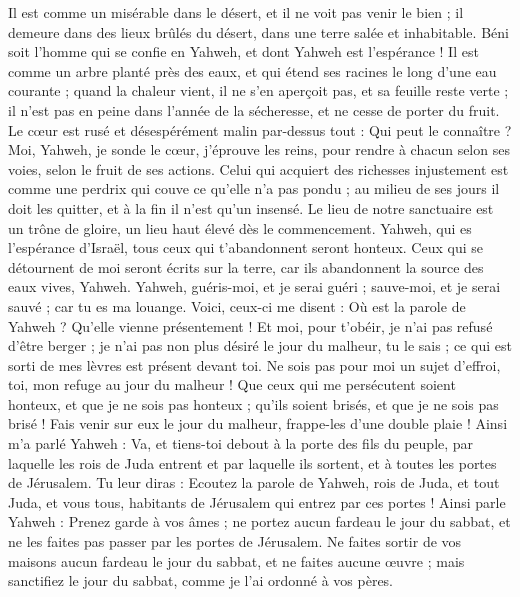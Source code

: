 \begin{multicols}{2}
Il est comme un misérable dans le désert, et il ne voit pas venir le bien ; il demeure dans des lieux brûlés du désert, dans une terre salée et inhabitable.
Béni soit l'homme qui se confie en Yahweh, et dont Yahweh est l'espérance !
Il est comme un arbre planté près des eaux, et qui étend ses racines le long d'une eau courante ; quand la chaleur vient, il ne s'en aperçoit pas, et sa feuille reste verte ; il n'est pas en peine dans l'année de la sécheresse, et ne cesse de porter du fruit.
Le cœur est rusé et désespérément malin par-dessus tout : Qui peut le connaître ?
Moi, Yahweh, je sonde le cœur, j'éprouve les reins, pour rendre à chacun selon ses voies, selon le fruit de ses actions.
Celui qui acquiert des richesses injustement est comme une perdrix qui couve ce qu'elle n'a pas pondu ; au milieu de ses jours il doit les quitter, et à la fin il n'est qu'un insensé.
Le lieu de notre sanctuaire est un trône de gloire, un lieu haut élevé dès le commencement.
Yahweh, qui es l'espérance d'Israël, tous ceux qui t'abandonnent seront honteux. Ceux qui se détournent de moi seront écrits sur la terre, car ils abandonnent la source des eaux vives, Yahweh.
Yahweh, guéris-moi, et je serai guéri ; sauve-moi, et je serai sauvé ; car tu es ma louange.
Voici, ceux-ci me disent : Où est la parole de Yahweh ? Qu'elle vienne présentement !
Et moi, pour t'obéir, je n'ai pas refusé d'être berger ; je n'ai pas non plus désiré le jour du malheur, tu le sais ; ce qui est sorti de mes lèvres est présent devant toi.
Ne sois pas pour moi un sujet d'effroi, toi, mon refuge au jour du malheur !
Que ceux qui me persécutent soient honteux, et que je ne sois pas honteux ; qu'ils soient brisés, et que je ne sois pas brisé ! Fais venir sur eux le jour du malheur, frappe-les d'une double plaie !
Ainsi m'a parlé Yahweh : Va, et tiens-toi debout à la porte des fils du peuple, par laquelle les rois de Juda entrent et par laquelle ils sortent, et à toutes les portes de Jérusalem.
Tu leur diras : Ecoutez la parole de Yahweh, rois de Juda, et tout Juda, et vous tous, habitants de Jérusalem qui entrez par ces portes !
Ainsi parle Yahweh : Prenez garde à vos âmes ; ne portez aucun fardeau le jour du sabbat, et ne les faites pas passer par les portes de Jérusalem.
Ne faites sortir de vos maisons aucun fardeau le jour du sabbat, et ne faites aucune œuvre ; mais sanctifiez le jour du sabbat, comme je l'ai ordonné à vos pères.

\end{multicols}
